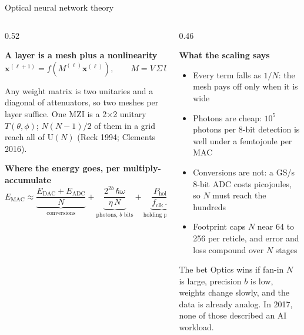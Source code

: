 \documentclass[aspectratio=169,10pt]{beamer}
\begin{document}
\begin{frame}{Optical neural network theory}
\begin{columns}[T]
\begin{column}{0.52\textwidth}
{\small
\textbf{A layer is a mesh plus a nonlinearity}
\vspace{-4pt}
\[
\mathbf{x}^{(\ell+1)} = f\!\left(M^{(\ell)}\mathbf{x}^{(\ell)}\right),\qquad
M = V\,\Sigma\,U^{\dagger}
\]
\vspace{-8pt}

Any weight matrix is two unitaries and a diagonal of attenuators, so two meshes per layer suffice. One MZI is a 2$\times$2 unitary $T(\theta,\phi)$; $N(N-1)/2$ of them in a grid reach all of $\mathrm{U}(N)$ (Reck 1994; Clements 2016).

\vspace{4pt}
\textbf{Where the energy goes, per multiply-accumulate}
\vspace{-4pt}
\[
E_{\mathrm{MAC}} \approx \underbrace{\frac{E_{\mathrm{DAC}}+E_{\mathrm{ADC}}}{N}}_{\text{conversions}}
+\underbrace{\frac{2^{2b}\,\hbar\omega}{\eta\,N}}_{\text{photons, } b \text{ bits}}
+\underbrace{\frac{P_{\mathrm{hold}}}{f_{\mathrm{clk}}\,N}}_{\text{holding phases}}
\]
}
\end{column}
\begin{column}{0.46\textwidth}
{\footnotesize
\textbf{What the scaling says}
\begin{itemize}\setlength{\itemsep}{3pt}
  \item Every term falls as $1/N$: the mesh pays off only when it is \alert{wide}
  \item Photons are cheap: $10^{5}$ photons per 8-bit detection is well under a femtojoule per MAC
  \item Conversions are not: a GS/s 8-bit ADC costs picojoules, so $N$ must reach the hundreds
  \item Footprint caps $N$ near 64 to 256 per reticle, and error and loss compound over $N$ stages
\end{itemize}
\vspace{2pt}
\begin{block}{The bet}
\footnotesize Optics wins if fan-in $N$ is large, precision $b$ is low, weights change slowly, and the data is already analog. In 2017, none of those described an AI workload.
\end{block}}
\end{column}
\end{columns}
\end{frame}
\end{document}
